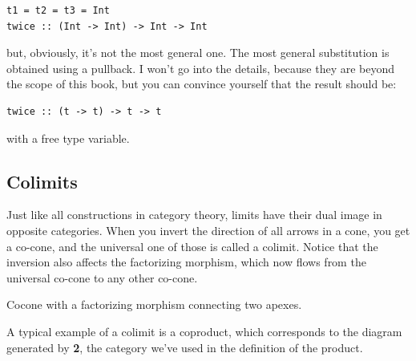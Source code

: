 \begin{verbatim}
t1 = t2 = t3 = Int 
twice :: (Int -> Int) -> Int -> Int
\end{verbatim}

but, obviously, it's not the most general one. The most general
substitution is obtained using a pullback. I won't go into the details,
because they are beyond the scope of this book, but you can convince
yourself that the result should be:

\begin{verbatim}
twice :: (t -> t) -> t -> t
\end{verbatim}

with  a free type variable.

\subsection{Colimits}\label{colimits}

Just like all constructions in category theory, limits have their dual
image in opposite categories. When you invert the direction of all
arrows in a cone, you get a co-cone, and the universal one of those is
called a colimit. Notice that the inversion also affects the factorizing
morphism, which now flows from the universal co-cone to any other
co-cone.

\begin{figure}[H]
    \centering
\end{figure}

Cocone with a factorizing morphism  connecting two apexes.

A typical example of a colimit is a coproduct, which corresponds to the
diagram generated by \textbf{2}, the category we've used in the
definition of the product.

